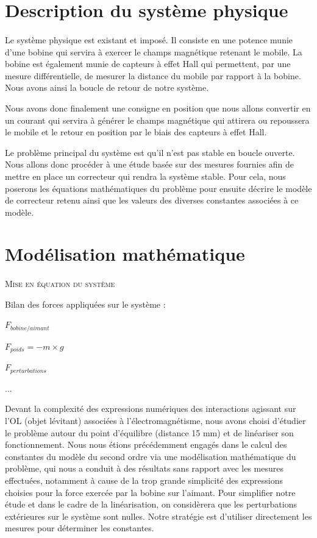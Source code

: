 \documentclass[11pt, french]{article} %
\begin{document}
\section{Description du système physique}
\paragraph{}

Le système physique est existant et imposé. Il consiste en une potence munie d'une bobine qui servira à exercer le champs magnétique retenant le mobile. La bobine est également munie de capteurs à effet Hall qui permettent, par une mesure différentielle, de mesurer la distance du mobile par rapport à la bobine. Nous avons ainsi la boucle de retour de notre système. 

Nous avons donc finalement une consigne en position que nous allons convertir en un courant qui servira à générer le champs magnétique qui attirera ou repoussera le mobile et le retour en position par le biais des capteurs à effet Hall. 

Le problème principal du système est qu'il n'est pas stable en boucle ouverte. Nous allons donc procéder à une étude basée sur des mesures fournies afin de mettre en place un correcteur qui rendra la système stable. Pour cela, nous poserons les équations mathématiques du problème pour ensuite décrire le modèle de correcteur retenu ainsi que les valeurs des diverses constantes associées à ce modèle.

\section{Modélisation mathématique}

\paragraph{}
\textsc{Mise en équation du système}

\noindent
Bilan des forces appliquées sur le système :

\smallskip
$ F_{bobine/aimant}  $

$ F_{poids} = -m \times g $

$ F_{perturbations} $

...

\medskip

\noindent
Devant la complexité des expressions numériques des interactions agissant sur l'OL (objet lévitant) associées à l'électromagnétisme, nous avons choisi d'étudier le problème autour du point d'équilibre (distance 15 mm) et de linéariser son fonctionnement.
Nous nous étions précédemment engagés dans le calcul des constantes du modèle du second ordre via une modélisation mathématique du problème, qui nous a conduit à des résultats sans rapport avec les mesures effectuées, notamment à cause de la trop grande simplicité des expressions choisies pour la force exercée par la bobine sur l'aimant. Pour simplifier notre étude et dans le cadre de la linéarisation, on considèrera que les perturbations extérieures sur le système sont nulles. Notre stratégie est d'utiliser directement les mesures pour déterminer les constantes.
\end{document}
